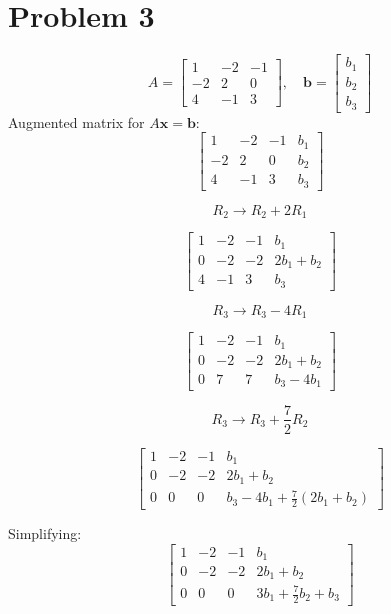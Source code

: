 \documentclass[12pt, a4paper]{article}
\begin{document}
\section*{Problem 3}
\[
    A = \begin{bmatrix}
        1 & -2 & -1 \\
       -2 & 2 & 0 \\
        4 & -1 & 3
\end{bmatrix}, \quad
    \boldsymbol{b} = \begin{bmatrix}
        b_1 \\
        b_2 \\
        b_3
\end{bmatrix}
\]
Augmented matrix for $A\boldsymbol{x} = \boldsymbol{b}$:
\[
    \begin{bmatrix}
        1 & -2 & -1 & b_1 \\
       -2 & 2 & 0 & b_2 \\
        4 & -1 & 3 & b_3
\end{bmatrix}
\]

\[R_2 \rightarrow R_2 + 2R_1\]

\[
    \begin{bmatrix}
        1 & -2 & -1 & b_1 \\
       0 & -2 & -2 & 2b_1+b_2 \\
        4 & -1 & 3 & b_3
\end{bmatrix}
\]

\[R_3 \rightarrow R_3 - 4R_1\]

\[
    \begin{bmatrix}
        1 & -2 & -1 & b_1 \\
       0 & -2 & -2 & 2b_1+b_2 \\
        0 & 7 & 7 & b_3-4b_1
\end{bmatrix}
\]

\[R_3 \rightarrow R_3 + \frac{7}{2}R_2\]

\[
    \begin{bmatrix}
        1 & -2 & -1 & b_1 \\
       0 & -2 & -2 & 2b_1+b_2 \\
        0 & 0 & 0 & b_3-4b_1+\frac{7}{2}(2b_1+b_2)
\end{bmatrix}
\]

Simplifying:
\[
    \begin{bmatrix}
        1 & -2 & -1 & b_1 \\
       0 & -2 & -2 & 2b_1+b_2 \\
        0 & 0 & 0 & 3b_1+\frac{7}{2}b_2+b_3
    \end{bmatrix}
\]
\[\]
\end{document}

